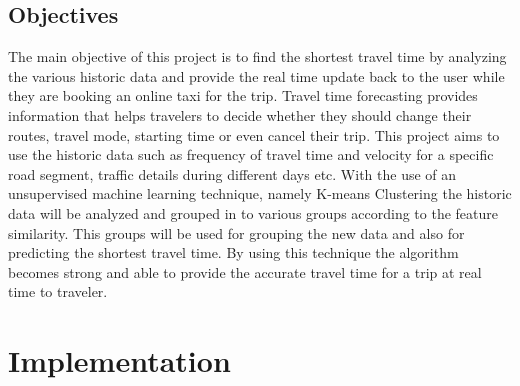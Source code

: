 \documentclass[12pt,report]{ucdavisthesis}
\begin{document}
    \section{Objectives}
    \hspace{2cm}The main objective of this project is to find the shortest travel time by analyzing
    the various historic data and provide the real time update back to the user while
    they are booking an online taxi for the trip. Travel time forecasting provides
    information that helps travelers to decide whether they should change their routes,
    travel mode, starting time or even cancel their trip. This project aims to use the
    historic data such as frequency of travel time and velocity for a specific road
    segment, traffic details during different days etc. With the use of an
    unsupervised machine learning technique, namely K-means Clustering the
    historic data will be analyzed and grouped in to various groups according to
    the feature similarity. This groups will be used for grouping the new data and
    also for predicting the shortest travel time. By using this technique the
    algorithm becomes strong and able to provide the accurate travel time for a trip
    at real time to traveler.

        \chapter{Implementation}\label{chp:chapter}
\end{document}
